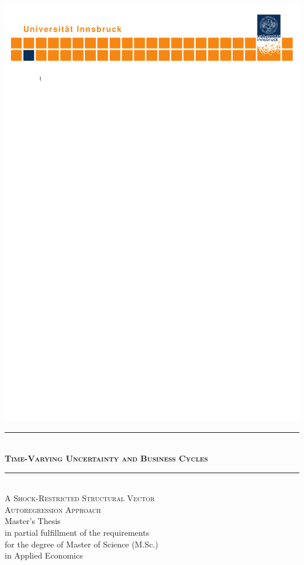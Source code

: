 \documentclass[a4paper,11pt,listof=nochaptergap,oneside,pointednumbers,bibtotoc,bigheadings,liststotoc,hidelinks]{scrbook}
\theoremstyle{mysatz}
\theoremstyle{mydefinition}
\theoremstyle{mytheorem}
\theoremstyle{mybemerkung}
\begin{document}
\begin{titlepage}
    \begin{center}
        \hspace*{-0.27\textwidth}\includegraphics[width=1.419\textwidth, trim = 5mm 250mm 0mm 0mm, clip = TRUE]{logo.pdf}\hspace*{-0.3\textwidth}
        \quad \\[0mm]
        \newcommand{\HRule}{\rule{\linewidth}{0.3mm}} %
        \HRule \\[-1mm]
        \Huge{\scshape\bfseries Time-Varying Uncertainty and Business Cycles} \\[-5mm]
        \HRule \\[2mm]
        \Large {\scshape A Shock-Restricted Structural Vector \\
        				Autoregression Approach} \\[10mm]
        \Large Master's Thesis \\[10mm]
        \Large in partial fulfillment of the requirements \\for the degree of Master of Science (M.Sc.)\\
                  in Applied Economics \\[10mm]
                  

\end{center}
\end{titlepage}
\end{document}
